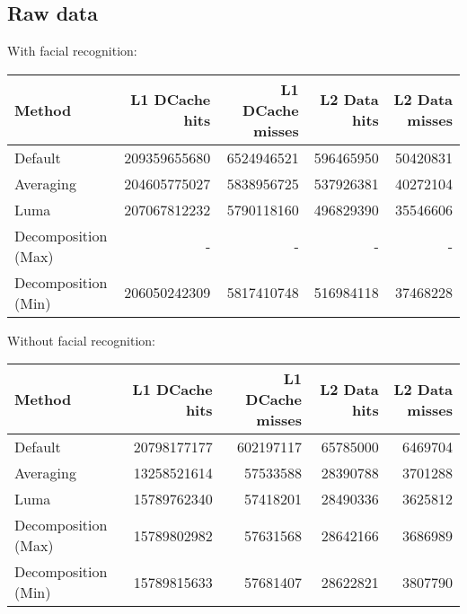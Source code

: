 \documentclass[a4paper]{article}
\begin{document}
\subsection{Raw data}

With facial recognition:
\begin{center}
\begin{tabular}{ |l||r|r|r|r| }
\hline
Method & L1 DCache hits & L1 DCache misses & L2 Data hits & L2 Data misses  \\
\hline\hline
Default & 209359655680 & 6524946521 & 596465950 & 50420831 \\
\hline
Averaging & 204605775027 & 5838956725 & 537926381 & 40272104 \\
\hline
Luma & 207067812232 & 5790118160 & 496829390 & 35546606 \\
\hline
Decomposition (Max)\footnotemark & - & - & - & - \\
\hline
Decomposition (Min) & 206050242309 & 5817410748 & 516984118 & 37468228 \\
\hline
\end{tabular}
\end{center}

Without facial recognition:
\begin{center}
\begin{tabular}{ |l||r|r|r|r| }
\hline
Method & L1 DCache hits & L1 DCache misses & L2 Data hits & L2 Data misses  \\
\hline\hline
Default & 20798177177 & 602197117 & 65785000 &  6469704 \\
\hline
Averaging & 13258521614 & 57533588 & 28390788 & 3701288 \\
\hline
Luma & 15789762340 & 57418201 & 28490336 &  3625812\\
\hline
Decomposition (Max) & 15789802982 & 57631568 & 28642166 & 3686989 \\
\hline
Decomposition (Min) & 15789815633 & 57681407 & 28622821 & 3807790 \\
\hline
\end{tabular}
\end{center}

\end{document}
